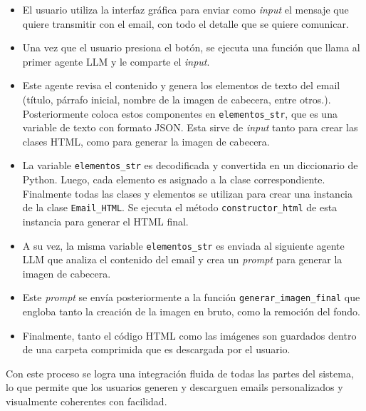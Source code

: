 \begin{itemize}
    \item El usuario utiliza la interfaz gráfica para enviar como \textit{input} el mensaje que quiere transmitir con el email, con todo el detalle que se quiere comunicar.
    \item Una vez que el usuario presiona el botón, se ejecuta una función que llama al primer agente LLM y le comparte el \textit{input}. 
    \item Este agente revisa el contenido y genera los elementos de texto del email (título, párrafo inicial, nombre de la imagen de cabecera, entre otros.). Posteriormente coloca estos componentes en \texttt{elementos\_str}, que es una variable de texto con formato JSON. Esta sirve de \textit{input} tanto para crear las clases HTML, como para generar la imagen de cabecera.
    \item La variable \texttt{elementos\_str} es decodificada y convertida en un diccionario de Python. Luego, cada elemento es asignado a la clase correspondiente. Finalmente todas las clases y elementos se utilizan para crear una instancia de la clase \texttt{Email\_HTML}. Se ejecuta el método \texttt{constructor\_html} de esta instancia para generar el HTML final.
    \item A su vez, la misma variable \texttt{elementos\_str} es enviada al siguiente agente LLM que analiza el contenido del email y crea un \textit{prompt} para generar la imagen de cabecera.
    \item Este \textit{prompt} se envía posteriormente a la función \texttt{generar\_imagen\_final} que engloba tanto la creación de la imagen en bruto, como la remoción del fondo.
    \item Finalmente, tanto el código HTML como las imágenes son guardados dentro de una carpeta comprimida que es descargada por el usuario.
\end{itemize}

Con este proceso se logra una integración fluida de todas las partes del sistema, lo que permite que los usuarios generen y descarguen emails personalizados y visualmente coherentes con facilidad.
